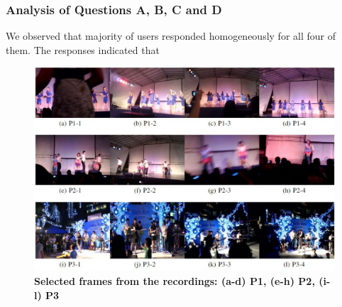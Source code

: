 \documentclass{sig-alternate-05-2015}
\begin{document}
\subsubsection{Analysis of Questions A, B, C and D}
We observed that majority of users responded homogeneously
for all four of them. The responses indicated that 

\begin{figure}
\centering
\includegraphics[width=5in]{video_4.pdf}
\caption{\textbf{Selected frames from the recordings: (a-d) P1, (e-h) P2, (i-l) P3}}
\end{figure}
\end{document}
